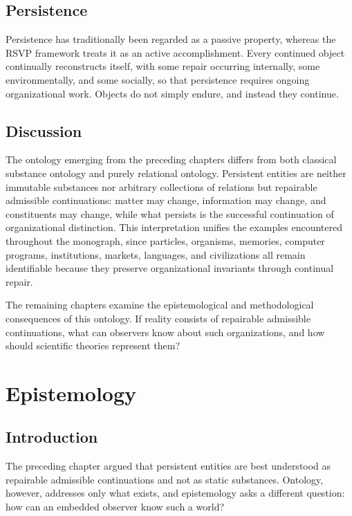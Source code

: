 \documentclass[11pt,oneside]{book}
\numberwithin{equation}{chapter}
\theoremstyle{definition}
\theoremstyle{plain}
\begin{document}
\section{Persistence}

Persistence has traditionally been regarded as a passive property, whereas the RSVP framework treats it as an active accomplishment. Every continued object continually reconstructs itself, with some repair occurring internally, some environmentally, and some socially, so that persistence requires ongoing organizational work. Objects do not simply endure, and instead they continue.

\section{Discussion}

The ontology emerging from the preceding chapters differs from both classical substance ontology and purely relational ontology. Persistent entities are neither immutable substances nor arbitrary collections of relations but repairable admissible continuations: matter may change, information may change, and constituents may change, while what persists is the successful continuation of organizational distinction. This interpretation unifies the examples encountered throughout the monograph, since particles, organisms, memories, computer programs, institutions, markets, languages, and civilizations all remain identifiable because they preserve organizational invariants through continual repair.

The remaining chapters examine the epistemological and methodological consequences of this ontology. If reality consists of repairable admissible continuations, what can observers know about such organizations, and how should scientific theories represent them?

\chapter{Epistemology}

\section{Introduction}

The preceding chapter argued that persistent entities are best understood as repairable admissible continuations and not as static substances. Ontology, however, addresses only what exists, and epistemology asks a different question: how can an embedded observer know such a world?
\end{document}
